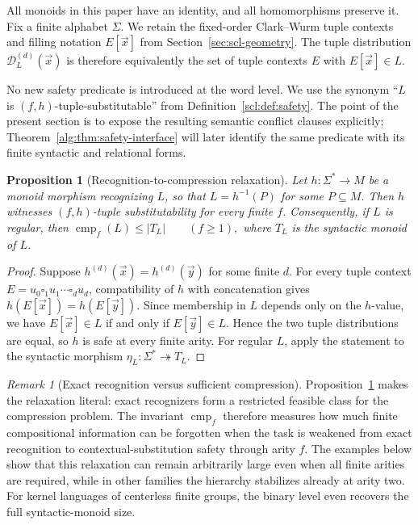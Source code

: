 \documentclass[10pt,a4paper]{article}
\newtheorem{proposition}[theorem]{Proposition}
\theoremstyle{definition}
\theoremstyle{remark}
\newtheorem{remark}[theorem]{Remark}
\newcommand{\cmp}{\operatorname{cmp}}
\newcommand{\D}{\mathcal D}
\newcommand{\blank}{\square}
\begin{document}
All monoids in this paper have an identity, and all homomorphisms preserve it.
Fix a finite alphabet \(\Sigma\).  We retain the fixed-order Clark--Wurm tuple
contexts and filling notation \(E[\vec x]\) from
Section~\ref{sec:scl-geometry}.  The tuple distribution
\(\D_L^{(d)}(\vec x)\) is therefore equivalently the set of tuple contexts
\(E\) with \(E[\vec x]\in L\).

No new safety predicate is introduced at the word level.  We use the synonym
``\(L\) is \((f,h)\)-tuple-substitutable'' from
Definition~\ref{scl:def:safety}.  The point of the present section is to expose
the resulting semantic conflict clauses explicitly; Theorem~\ref{alg:thm:safety-interface}
will later identify the same predicate with its finite syntactic and relational
forms.

\begin{proposition}[Recognition-to-compression relaxation]
\label{conf:prop:recognition-relaxation}
Let \(h:\Sigma^*\to M\) be a monoid morphism recognizing \(L\), so that
\(L=h^{-1}(P)\) for some \(P\subseteq M\). Then \(h\) witnesses
\((f,h)\)-tuple substitutability for every finite \(f\). Consequently, if \(L\)
is regular, then
\(
\cmp_f(L)\le |T_L|
\qquad(f\ge1),
\)
where \(T_L\) is the syntactic monoid of \(L\).
\end{proposition}

\begin{proof}
Suppose \(h^{(d)}(\vec x)=h^{(d)}(\vec y)\) for some finite \(d\). For every
tuple context
\(E=u_0\blank_1u_1\cdots\blank_du_d\),
compatibility of \(h\) with concatenation gives
\(
h(E[\vec x])=h(E[\vec y]).
\)
Since membership in \(L\) depends only on the \(h\)-value, we have
\(E[\vec x]\in L\) if and only if \(E[\vec y]\in L\). Hence the two tuple
distributions are equal, so \(h\) is safe at every finite arity. For regular \(L\), apply the statement to the syntactic morphism
\(\eta_L:\Sigma^*\twoheadrightarrow T_L\).
\end{proof}

\begin{remark}[Exact recognition versus sufficient compression]
Proposition~\ref{conf:prop:recognition-relaxation} makes the relaxation
literal: exact recognizers form a restricted feasible class for the
compression problem. The invariant \(\cmp_f\) therefore measures how much
finite compositional information can be forgotten when the task is weakened
from exact recognition to contextual-substitution safety through arity \(f\).
The examples below show that this relaxation can remain arbitrarily large even
when all finite arities are required, while in other families the hierarchy
stabilizes already at arity two.  For kernel languages of centerless finite
groups, the binary level even recovers the full syntactic-monoid size.
\end{remark}
\end{document}
